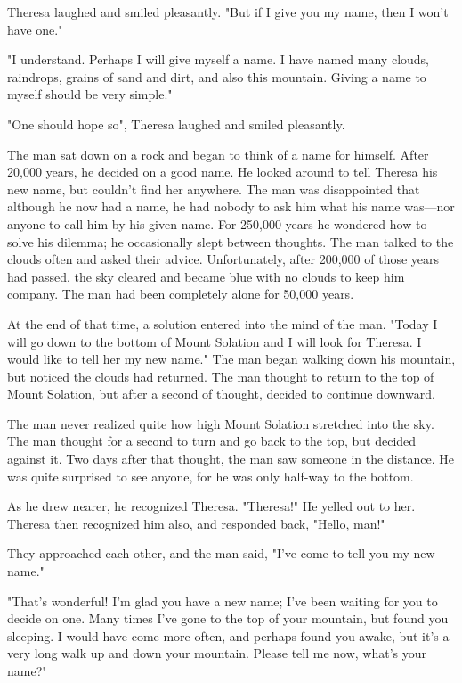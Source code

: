 Theresa laughed and smiled pleasantly. "But if I give you my name, then I won't have one."

"I understand. Perhaps I will give myself a name. I have named many clouds, raindrops, grains of sand and dirt, and also this mountain. Giving a name to myself should be very simple."

"One should hope so", Theresa laughed and smiled pleasantly.

The man sat down on a rock and began to think of a name for himself. After 20,000 years, he decided on a good name. He looked around to tell Theresa his new name, but couldn't find her anywhere. The man was disappointed that although he now had a name, he had nobody to ask him what his name was—nor anyone to call him by his given name. For 250,000 years he wondered how to solve his dilemma; he occasionally slept between thoughts. The man talked to the clouds often and asked their advice. Unfortunately, after 200,000 of those years had passed, the sky cleared and became blue with no clouds to keep him company. The man had been completely alone for 50,000 years.

At the end of that time, a solution entered into the mind of the man. "Today I will go down to the bottom of Mount Solation and I will look for Theresa. I would like to tell her my new name." The man began walking down his mountain, but noticed the clouds had returned. The man thought to return to the top of Mount Solation, but after a second of thought, decided to continue downward.

The man never realized quite how high Mount Solation stretched into the sky. The man thought for a second to turn and go back to the top, but decided against it. Two days after that thought, the man saw someone in the distance. He was quite surprised to see anyone, for he was only half-way to the bottom.

As he drew nearer, he recognized Theresa. "Theresa!" He yelled out to her. Theresa then recognized him also, and responded back, "Hello, man!"

They approached each other, and the man said, "I've come to tell you my new name."

"That's wonderful! I'm glad you have a new name; I've been waiting for you to decide on one. Many times I've gone to the top of your mountain, but found you sleeping. I would have come more often, and perhaps found you awake, but it's a very long walk up and down your mountain. Please tell me now, what's your name?"

